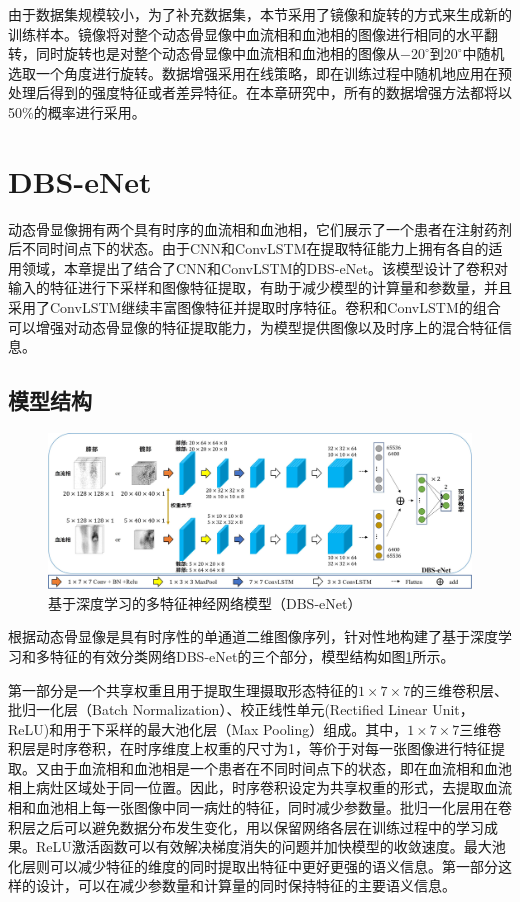 由于数据集规模较小，为了补充数据集，本节采用了镜像和旋转的方式来生成新的训练样本。镜像将对整个动态骨显像中血流相和血池相的图像进行相同的水平翻转，同时旋转也是对整个动态骨显像中血流相和血池相的图像从\(-20^{\circ}\)到\(20^{\circ}\)中随机选取一个角度进行旋转。数据增强采用在线策略，即在训练过程中随机地应用在预处理后得到的强度特征或者差异特征。在本章研究中，所有的数据增强方法都将以50\%的概率进行采用。

\section{DBS-eNet}

动态骨显像拥有两个具有时序的血流相和血池相，它们展示了一个患者在注射药剂后不同时间点下的状态。由于CNN和ConvLSTM在提取特征能力上拥有各自的适用领域，本章提出了结合了CNN和ConvLSTM的DBS-eNet。该模型设计了卷积对输入的特征进行下采样和图像特征提取，有助于减少模型的计算量和参数量，并且采用了ConvLSTM继续丰富图像特征并提取时序特征。卷积和ConvLSTM的组合可以增强对动态骨显像的特征提取能力，为模型提供图像以及时序上的混合特征信息。

\subsection{模型结构}

\begin{figure}[H]
  \centering
  \includegraphics[width=\textwidth]{figures/chap03_framework.jpg}
  \caption{基于深度学习的多特征神经网络模型（DBS-eNet）}
  \label{fig:chap03_framework}
\end{figure}

根据动态骨显像是具有时序性的单通道二维图像序列，针对性地构建了基于深度学习和多特征的有效分类网络DBS-eNet的三个部分，模型结构如图\ref{fig:chap03_framework}所示。

第一部分是一个共享权重且用于提取生理摄取形态特征的\(1 \times 7 \times 7\)的三维卷积层、批归一化层（Batch Normalization）\cite{ioffe2015batch}、校正线性单元(Rectified Linear Unit，ReLU)和用于下采样的最大池化层（Max Pooling）组成。其中，\(1 \times 7 \times 7\)三维卷积层是时序卷积，在时序维度上权重的尺寸为1，等价于对每一张图像进行特征提取。又由于血流相和血池相是一个患者在不同时间点下的状态，即在血流相和血池相上病灶区域处于同一位置。因此，时序卷积设定为共享权重的形式，去提取血流相和血池相上每一张图像中同一病灶的特征，同时减少参数量。批归一化层用在卷积层之后可以避免数据分布发生变化，用以保留网络各层在训练过程中的学习成果。ReLU激活函数可以有效解决梯度消失的问题并加快模型的收敛速度。最大池化层则可以减少特征的维度的同时提取出特征中更好更强的语义信息。第一部分这样的设计，可以在减少参数量和计算量的同时保持特征的主要语义信息。

